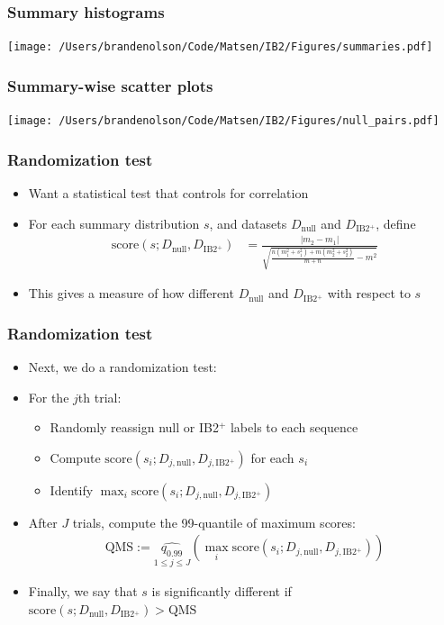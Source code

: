 \documentclass[mathserif,compress]{beamer}
\newcommand*\ba{\[ \begin{aligned}}
\newcommand*\ea{\end{aligned} \]}
\renewcommand\;{\,}
\begin{document}
\begin{frame}\frametitle{Summary histograms}
\begin{center}
\texttt{[image: /Users/brandenolson/Code/Matsen/IB2/Figures/summaries.pdf]}
\end{center}
\end{frame}

\begin{frame}\frametitle{Summary-wise scatter plots}
\begin{center}
\texttt{[image: /Users/brandenolson/Code/Matsen/IB2/Figures/null\_pairs.pdf]}
\end{center}
\end{frame}

\begin{frame}\frametitle{Randomization test}
\begin{itemize}
\item
Want a statistical test that controls for correlation
\bigskip
\item
For each summary distribution $s$, and datasets $D_\text{null}$ and $D_\text{IB2$^+$}$, define
\ba
\text{score}(s; D_\text{null}, D_\text{IB2$^+$})
	& = \frac{|m_2 - m_1|}
		{ \sqrt{ \frac{n(m_1^2 + s_1^2) + m(m_2^2 + s_2^2)}{m + n} - m^2 } }
\ea
\item
This gives a measure of how different $D_\text{null}$ and $D_\text{IB2$^+$}$ with respect to $s$
\end{itemize}
\end{frame}

\begin{frame}\frametitle{Randomization test}
\begin{itemize}
\item[]
Next, we do a randomization test:
\bigskip
\smallskip
\item[]
For the $j$th trial: 
\begin{itemize}
\item
Randomly reassign null or IB2$^+$ labels to each sequence
\bigskip
\item
Compute $\text{score}(s_i; D_{j, \text{null}}, D_{j, \text{IB2$^+$}})$ for each $s_i$
\item
\bigskip
Identify $\max_i \text{score}(s_i; D_{j, \text{null}}, D_{j, \text{IB2$^+$}})$
\end{itemize}
\bigskip
\item[]
After $J$ trials, compute the 99-quantile of maximum scores:
\ba
\text{QMS} := \underset{1 \le j \le J}{\widehat{q_{0.99}}} \left(
	\max_i \text{score} (s_i; D_{j, \text{null}}, D_{j, \text{IB2$^+$}})
	\right)
\ea
\item[]
Finally, we say that $s$ is significantly different if 
$\text{score}(s; D_\text{null}, D_\text{IB2$^+$})
	> \text{QMS}$

\end{itemize}
\end{frame}
\end{document}
